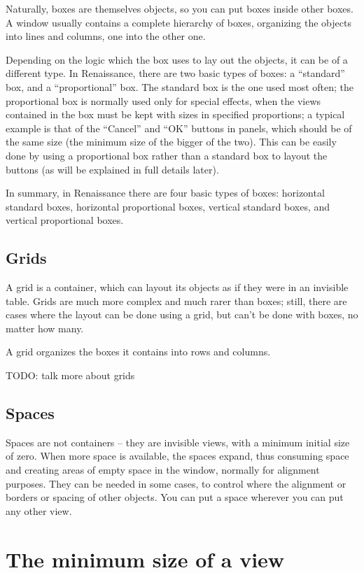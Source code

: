 Naturally, boxes are themselves objects, so you can put boxes inside
other boxes.  A window usually contains a complete hierarchy of boxes,
organizing the objects into lines and columns, one into the other one.

Depending on the logic which the box uses to lay out the objects, it
can be of a different type.  In Renaissance, there are two basic types of
boxes: a ``standard'' box, and a ``proportional'' box.  The standard
box is the one used most often; the proportional box is normally used
only for special effects, when the views contained in the box must be
kept with sizes in specified proportions; a typical example is that of
the ``Cancel'' and ``OK'' buttons in panels, which should be of the
same size (the minimum size of the bigger of the two).  This can be
easily done by using a proportional box rather than a standard box to
layout the buttons (as will be explained in full details later).

In summary, in Renaissance there are four basic types of boxes:
horizontal standard boxes, horizontal proportional boxes, vertical
standard boxes, and vertical proportional boxes.

\subsection{Grids}
A grid is a container, which can layout its objects as if they were in
an invisible table.  Grids are much more complex and much rarer than
boxes; still, there are cases where the layout can be done using a
grid, but can't be done with boxes, no matter how many.

A grid organizes the boxes it contains into rows and columns.

TODO: talk more about grids

\subsection{Spaces}
Spaces are not containers -- they are invisible views, with a minimum
initial size of zero.  When more space is available, the spaces
expand, thus consuming space and creating areas of empty space in the
window, normally for alignment purposes.  They can be needed in some
cases, to control where the alignment or borders or spacing of other
objects.  You can put a space wherever you can put any other view.

\section{The minimum size of a view}

